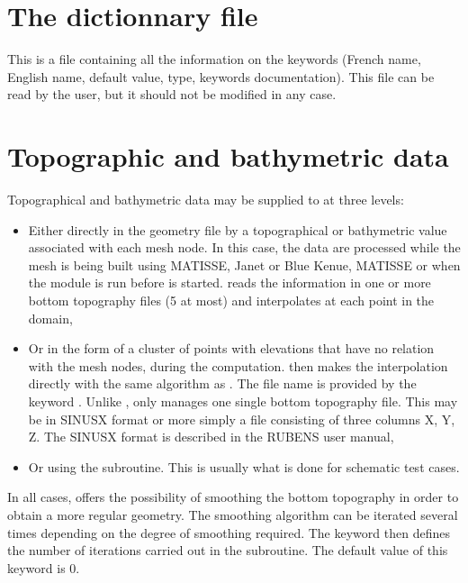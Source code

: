 \section{The dictionnary file}

This is a file containing all the information on the keywords (French name,
English name, default value, type, keywords documentation). This file can be
read by the user, but it should not be modified in any case.

\section{Topographic and bathymetric data}
\label{sec:topo}
Topographical and bathymetric data may be supplied to  at three
levels:

\begin{itemize}
\item Either directly in the geometry file by a topographical or bathymetric
value associated with each mesh node. In this case, the data are processed
while the mesh is being built using MATISSE, Janet or Blue Kenue, MATISSE or
when the \bief module is run before  is started. \bief reads
the information in one or more bottom topography files (5 at most) and
interpolates at each point in the domain,

\item Or in the form of a cluster of points with elevations that have no
relation with the mesh nodes, during the  computation. 
then makes the interpolation directly with the same algorithm as \bief. The
file name is provided by the keyword . Unlike
\bief,  only manages one single bottom topography file. This may be
in SINUSX format or more simply a file consisting of three columns X, Y, Z. The
SINUSX format is described in the RUBENS user manual,

\item Or using the  subroutine.
This is usually what is done for schematic test cases.
\end{itemize}

In all cases,  offers the possibility of smoothing the bottom
topography in order to obtain a more regular geometry. The smoothing algorithm
can be iterated several times depending on the degree of smoothing required.
The keyword  then defines the number of
iterations carried out in the  subroutine. The default
value of this keyword is 0.
